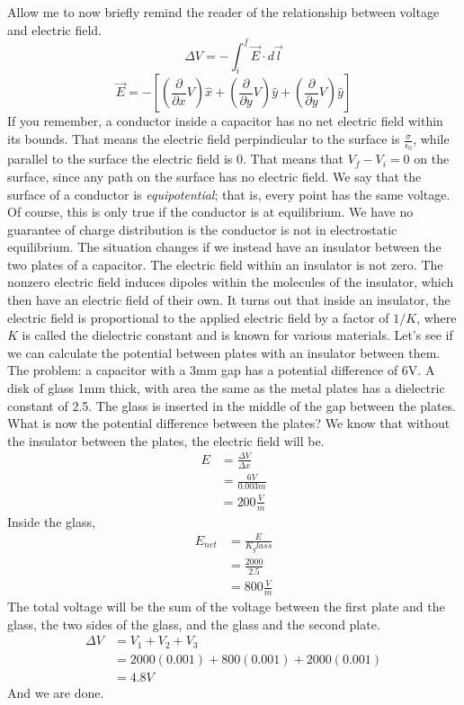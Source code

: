 \documentclass[nobib]{tufte-handout}
\begin{document}
Allow me to now briefly remind the reader of 
the relationship between voltage and electric field. 
\[\Delta V = -\int_{i}^{f} \vec{E}\cdot d\vec{l}\]
\[\vec{E} = - \left[ \left(\frac{\partial}{\partial x}V\right)\hat{x} + \left(\frac{\partial}{\partial y}V\right)\hat{y} + \left(\frac{\partial}{\partial y}V\right)\hat{y} \right]\]
If you remember, a conductor inside a capacitor
has no net electric field within its bounds. 
That means the electric field perpindicular to 
the surface is $\frac{\sigma}{\epsilon_0}$, while parallel 
to the surface the electric field is 0. 
That means that $V_f - V_i = 0$ on 
the surface, since any path on the surface has 
no electric field. We say that the surface of 
a conductor is \emph{equipotential}; that is, 
every point has the same voltage. Of course, this 
is only true if the conductor is at equilibrium.
We have no guarantee of charge distribution is the 
conductor is not in electrostatic equilibrium. 
The situation changes if we instead have an insulator 
between the two plates of a capacitor. The electric field 
within an insulator is not zero. The nonzero 
electric field induces dipoles within the molecules 
of the insulator, which then have an electric field of their own. 
It turns out that inside an insulator, the electric field is 
proportional to the applied electric field by a factor of $1/K$, 
where $K$ is called the dielectric constant and is known for various materials. 
Let's see if we can calculate the potential between plates with an insulator between 
them. The problem: a capacitor with a 3mm gap has a potential
difference of 6V. A disk of glass 1mm thick, with
area the same as the metal plates has a dielectric
constant of 2.5. The glass is inserted in the middle
of the gap between the plates. What is now the
potential difference between the plates? 
We know that without the insulator between the plates, the electric 
field will be. 
\begin{align*}
    E &= \frac{\Delta V}{\Delta x} \\
    &= \frac{6V}{0.003 m} \\
    &= 200 \frac{V}{m}
\end{align*}
Inside the glass, 
\begin{align*}
    E_{net} &= \frac{E}{K_glass} \\
    &= \frac{2000}{2.5} \\
    &= 800 \frac{V}{m}
\end{align*}
The total voltage will be the sum of the voltage 
between the first plate and the glass, the two sides of 
the glass, and the glass and the second plate. 
\begin{align*}
    \Delta V &= V_1 + V_2 + V_3 \\
    &= 2000(0.001) + 800(0.001) + 2000(0.001) \\
    &= 4.8 V
\end{align*}
And we are done. 
\end{document}

